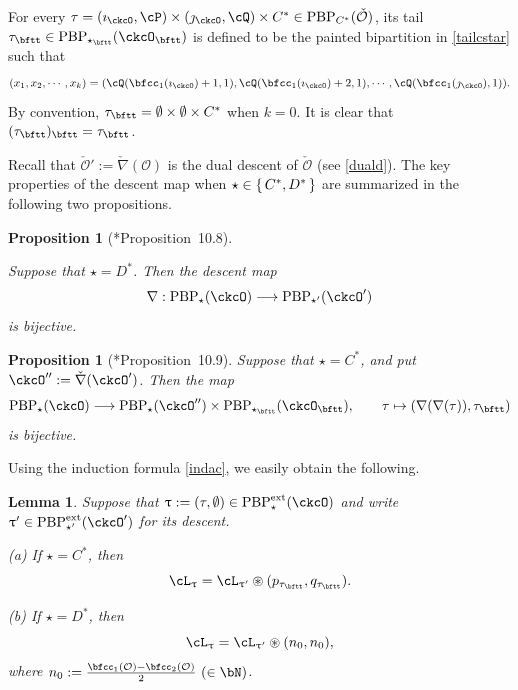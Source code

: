 \documentclass[11pt,a4paper]{amsart}
\newcommand{\CO}{{\mathcal {O}}}
\def\DD{\nabla}
\numberwithin{equation}{section}
\newtheorem{lem}[thm]{Lemma}
\newtheorem{prop}[thm]{Proposition}
\theoremstyle{remark}
\def\PBPes{\mathrm{PBP}^{\mathrm{ext}}_{\star}}
\def\PBPesp{\mathrm{PBP}^{\mathrm{ext}}_{\star'}}
\def\ckcOp{\ckcO^{\prime}}
\def\ckcOpp{\ckcO^{\prime\prime}}
\def\ckDD{{\check\DD}}
\def\PBP{\mathrm{PBP}}
\def\ac{\cL}
\begin{document}
\medskip

For every $\tau=(\imath_\ckcO,\cP)\times(\jmath_\ckcO,\cQ)\times C^* \in
\mathrm{PBP}_{C^*}(\check \CO) $, its tail $\tau_\bftt\in\PBP_{\star_\bftt}(\ckcO_\bftt) $  is defined to be the painted bipartition in
 \eqref{tailcstar} such that
\[
  (x_1, x_2, \cdots, x_k)= (\cQ(\bfcc_{1}(\imath_\ckcO)+1,1),\cQ(\bfcc_{1}(\imath_\ckcO)+2,1),\cdots, \cQ(\bfcc_{1}(\jmath_\ckcO),1)).
\]
By convention, $\tau_\bftt=\emptyset\times \emptyset \times C^*$ when $k=0$.
It is clear that $(\tau_\bftt)_\bftt=\tau_\bftt$.



Recall that $\check \CO':=\check \nabla(\CO)$ is the dual descent of $\check \CO$ (see \eqref{duald}).  The key properties of the descent map
when $\star\in \set{C^*,D^*}$
are summarized in the following two propositions.

\begin{prop}[{\cite{BMSZa}*{Proposition~10.8}}]\label{prop:CC.bijq}

Suppose that $\star =D^*$. Then   the descent map
\begin{equation}\label{eq:DD.CCq}
\nabla: \PBP_\star(\ckcO)\longrightarrow  \PBP_{\star'}(\ckcOp)
\end{equation}
 is bijective.

\end{prop}


\begin{prop}[{\cite{BMSZa}*{Proposition~10.9}}]
\label{lem:deltaq}
Suppose that $\star =C^*$, and put  $\ckcOpp := \ckDD(\ckcO')$.  Then the map
\[
  \PBP_\star(\ckcO)\longrightarrow
    \PBP_\star(\ckcOpp)\times \PBP_{\star_\bftt}(\ckcO_\bftt),
    \qquad \tau \mapsto (\DD(\DD(\tau)),\tau_\bftt)
\]
is bijective.

\end{prop}

Using the induction formula \eqref{indac}, we easily obtain the following.

\begin{lem}\label{indcdstar}
Suppose that $\uptau:=(\tau,\emptyset)\in \PBPes(\ckcO)$ and write $\uptau'\in \PBPesp(\ckcO')$ for its descent.

 \noindent (a)
  If $\star = C^{*}$, then
  \[
    \ac_{\uptau}=\ac_{\uptau'} \circledast  (p_{\tau_{\bftt}},q_{\tau_{\bftt}}).
\]

\noindent (b)
If $\star = D^{*}$, then
  \[
    \ac_{\uptau}=\ac_{\uptau'} \circledast (n_{0},n_{0}),
  \]
  where $n_0:=\frac{\bfcc_1(\CO)-\bfcc_2(\CO)}{2}\  (\in \bN)$.
\end{lem}
\end{document}
